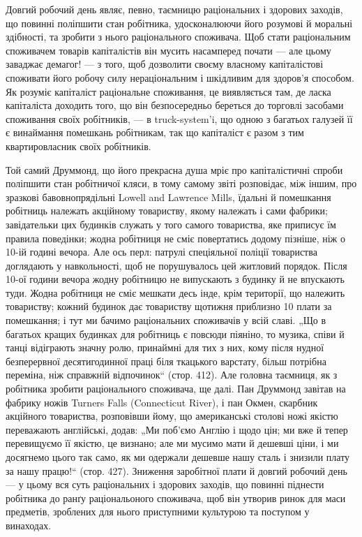 Довгий робочий день являє, певно, таємницю раціональних і здорових
заходів, що повинні поліпшити стан робітника, удосконалюючи його розумові
й моральні здібності, та зробити з нього раціонального споживача.
Щоб стати раціональним споживачем товарів капіталістів він мусить
насамперед почати — але цьому заваджає демагог! — з того, щоб дозволити
своєму власному капіталістові споживати його робочу силу
нераціональним і шкідливим для здоров’я способом. Як розуміє
капіталіст раціональне споживання, це виявляється там, де ласка капіталіста
доходить того, що він безпосередньо береться до торговлі
засобами споживання своїх робітників, — в truck-system’i, що одною з
багатьох галузей її є винаймання помешкань робітникам, так що капіталіст
є разом з тим квартировласник своїх робітників.

Той самий Друммонд, що його прекрасна душа мріє про капіталістичні
спроби поліпшити стан робітничої кляси, в тому самому звіті розповідає,
між іншим, про зразкові бавовнопрядільні Lowell and Lawrence Mills,
їдальні й помешкання робітниць належать акційному товариству, якому
належать і сами фабрики; завідательки цих будинків служать у того
самого товариства, яке приписує їм правила поведінки; жодна робітниця
не сміє повертатись додому пізніше, ніж о 10-ій годині вечора. Але
ось перл: патрулі спеціяльної поліції товариства доглядають у навкольності,
щоб не порушувалось цей житловий порядок. Після 10-ої години
вечора жодну робітницю не випускають з будинку й не впускають туди.
Жодна робітниця не сміє мешкати десь інде, крім території, що належить
товариству; кожний будинок дає товариству щотижня приблизно 10
плати за помешкання; і тут ми бачимо раціональних споживачів у всій
славі. „Що в багатьох кращих будинках для робітниць є повсюди піяніно,
то музика, співи й танці відіграють значну ролю, принаймні для тих з
них, кому після нудної безперервної десятигодинної праці біля ткацького
варстату, більш потрібна переміна, ніж справжній відпочинок“ (стор. 412).
Але головна таємниця, як з робітника зробити раціонального споживача,
ще далі. Пан Друммонд завітав на фабрику ножів Turners Falls (Connecticut
River), і пан Окмен, скарбник акційного товариства, розповівши
йому, що американські столові ножі якістю переважають англійські, додав:
„Ми поб’ємо Англію і щодо цін; ми вже й тепер перевищуємо її якістю,
це визнано; але ми мусимо мати й дешевші ціни, і ми досягнемо цього
так само, як ми одержали дешевше нашу сталь і знизили плату за нашу
працю!“ (стор. 427). Зниження заробітної плати й довгий робочий день —
у цьому вся суть раціональних і здорових заходів, що повинні піднести
робітника до ранґу раціональоного споживача, щоб він утворив ринок
для маси предметів, зроблених для нього приступними культурою та поступом
у винаходах.

